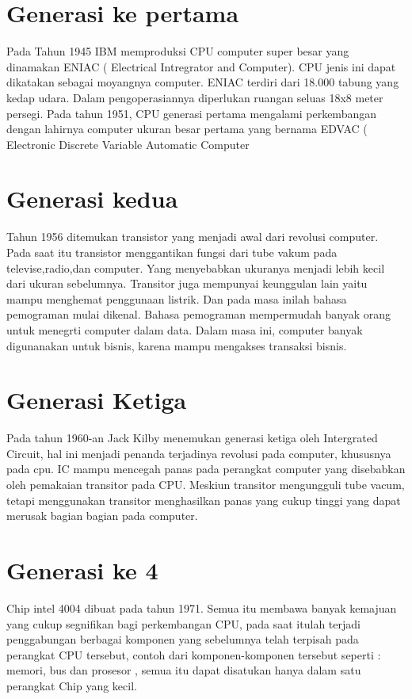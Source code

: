 	\section{Generasi ke pertama}
Pada Tahun 1945 IBM memproduksi CPU computer super besar yang dinamakan ENIAC ( Electrical Intregrator and Computer). CPU jenis ini dapat dikatakan sebagai moyangnya computer. ENIAC  terdiri dari 18.000 tabung yang kedap udara. Dalam pengoperasiannya diperlukan ruangan seluas 18x8 meter persegi.
Pada tahun 1951, CPU generasi pertama mengalami perkembangan dengan lahirnya computer ukuran besar pertama yang bernama EDVAC ( Electronic Discrete Variable Automatic Computer

	\section{Generasi kedua}
 Tahun 1956 ditemukan transistor yang menjadi awal dari revolusi computer. Pada saat itu transistor menggantikan fungsi dari tube vakum pada televise,radio,dan computer. Yang menyebabkan ukuranya menjadi lebih kecil dari ukuran sebelumnya. Transitor juga mempunyai keunggulan lain yaitu mampu menghemat penggunaan listrik.
 Dan pada masa inilah bahasa pemograman mulai dikenal. Bahasa pemograman mempermudah banyak orang untuk menegrti computer dalam data. Dalam masa ini, computer banyak digunanakan untuk bisnis, karena mampu mengakses transaksi bisnis.

 	\section{Generasi Ketiga}
 Pada tahun 1960-an Jack Kilby menemukan generasi ketiga oleh Intergrated Circuit, hal ini menjadi penanda terjadinya revolusi pada computer, khususnya pada cpu. IC mampu mencegah panas pada perangkat computer yang disebabkan oleh pemakaian transitor pada CPU.
 Meskiun transitor mengungguli tube vacum, tetapi menggunakan transitor menghasilkan panas yang cukup tinggi yang dapat merusak bagian bagian pada computer. 

 	\section{Generasi ke 4}
 Chip intel 4004 dibuat pada tahun 1971. Semua itu membawa banyak kemajuan yang cukup segnifikan bagi perkembangan CPU, pada saat itulah terjadi  penggabungan  berbagai komponen yang sebelumnya telah terpisah pada perangkat CPU tersebut, contoh dari komponen-komponen tersebut seperti : memori, bus dan prosesor , semua itu dapat disatukan hanya dalam satu perangkat Chip yang kecil.
